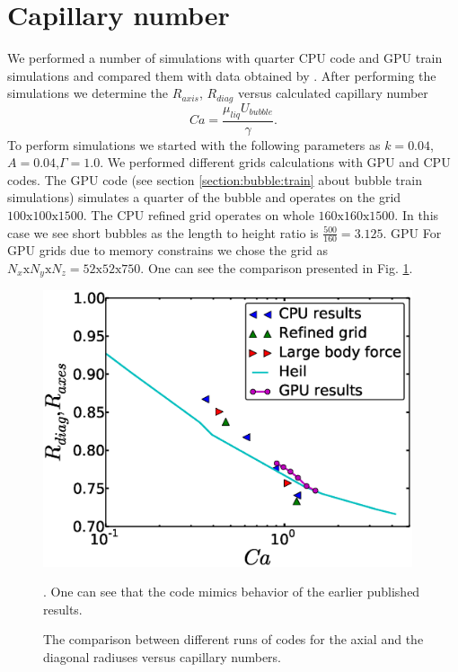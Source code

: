 \documentclass{article}
\begin{document}
\section{Capillary number}
We performed a number of simulations with quarter CPU code and GPU train simulations and compared
them with data obtained by \cite{heil-threedim}. After performing the simulations we determine the
$R_{axis}$, $R_{diag}$ versus calculated
capillary number
\begin{equation}
Ca=\frac{\mu_{liq} U_{bubble}}{\gamma}.
\end{equation}
To perform simulations we
started with the following parameters as
$k=0.04$,$A=0.04$,$\Gamma=1.0$. We performed different grids calculations with GPU and CPU codes.
The GPU code (see section \ref{section:bubble:train} about bubble train simulations) simulates a
quarter of the bubble and operates on the grid $100\mathrm{x}100\mathrm{x}1500$. The CPU refined
grid operates on whole $160\mathrm{x}160\mathrm{x}1500$. In this case we see short bubbles as the
length to height ratio is $\frac{500}{160}=3.125$. GPU  For GPU grids due to memory constrains we
chose the grid as $N_x\mathrm{x}N_y\mathrm{x}N_z=52\mathrm{x}52\mathrm{x}750$. One can see the
comparison presented in Fig. \ref{fig:capillary:comparison}.
\begin{figure}
\includegraphics[width=0.97\textwidth]{Figures/capillaries_comparison.eps}
\caption{The comparison between different runs of codes for the axial and the diagonal radiuses
versus capillary numbers. \label{fig:capillary:comparison}}. One can see that the code mimics
behavior of the earlier published results.
\end{figure}
\end{document}
